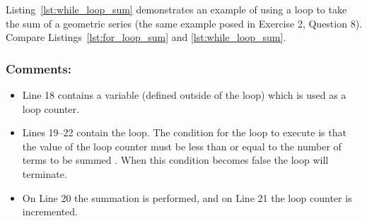 Listing~\ref{lst:while_loop_sum} demonstrates an example of using a  loop to take the sum of a geometric series (the same example posed in Exercise 2, Question 8). Compare Listings~\ref{lst:for_loop_sum} and \ref{lst:while_loop_sum}.


\subsubsection{Comments:}
\begin{itemize}
\item Line 18 contains a variable  (defined outside of the loop) which is used as a loop counter.
\item Lines 19--22 contain the  loop. The condition for the loop to execute is that the value of the loop counter  must be less than or equal to the number of terms to be summed . When this condition becomes false the loop will terminate.
\item On Line 20 the summation is performed, and on Line 21 the loop counter is incremented.
\end{itemize}

\vspace{5mm}

